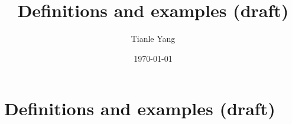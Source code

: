 \documentclass{noteformyself}
\title{Definitions and examples (draft)}
\author{Tianle Yang}
\date{\today}
\begin{document}
    \maketitle

    \section{Definitions and examples (draft)}



\end{document}
